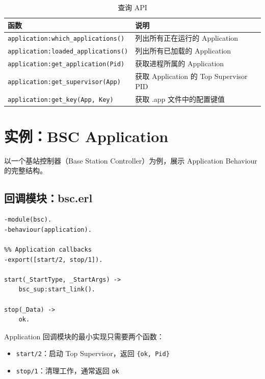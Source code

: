 \documentclass[a4paper,11pt]{article}
\begin{document}
\begin{table}[H]
\centering
\begin{tabular}{@{}lp{7cm}@{}}
\toprule
\textbf{函数} & \textbf{说明} \\
\midrule
\texttt{application:which\_applications()} & 列出所有正在运行的 Application \\
\texttt{application:loaded\_applications()} & 列出所有已加载的 Application \\
\texttt{application:get\_application(Pid)} & 获取进程所属的 Application \\
\texttt{application:get\_supervisor(App)} & 获取 Application 的 Top Supervisor PID \\
\texttt{application:get\_key(App, Key)} & 获取 .app 文件中的配置键值 \\
\bottomrule
\end{tabular}
\caption{查询 API}
\end{table}


\section{实例：BSC Application}

以一个基站控制器（Base Station Controller）为例，展示 Application Behaviour 的完整结构。

\subsection{回调模块：bsc.erl}

\begin{lstlisting}[style=erlangstyle, caption={bsc.erl --- Application 回调模块}]
-module(bsc).
-behaviour(application).

%% Application callbacks
-export([start/2, stop/1]).

start(_StartType, _StartArgs) ->
    bsc_sup:start_link().

stop(_Data) ->
    ok.
\end{lstlisting}

\begin{tipbox}[最小实现]
Application 回调模块的最小实现只需要两个函数：
\begin{itemize}[leftmargin=1.5em]
    \item \texttt{start/2}：启动 Top Supervisor，返回 \texttt{\{ok, Pid\}}
    \item \texttt{stop/1}：清理工作，通常返回 \texttt{ok}
\end{itemize}
\end{tipbox}
\end{document}
